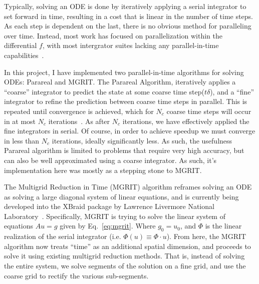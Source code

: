 \documentclass{article}
\begin{document}
Typically, solving an ODE is done by iteratively applying a serial integrator to set forward in time, resulting in a cost that is linear in the number of time steps.
As each step is dependent on the last, there is no obvious method for paralleling over time.
Instead, most work has focused on parallelization within the differential \(f\), with most intergrator suites lacking any parallel-in-time capabilities~\cite{ComparisonDifferentialEquation2017}.

In this project, I have implemented two parallel-in-time algorithms for solving ODEs: Parareal\cite{lionsResolutionEDPPar2001} and MGRIT\cite{friedhoffMULTIGRIDINTIMEALGORITHMSOLVING}.
The Parareal Algorithm, iteratively applies a ``coarse'' integrator to predict the state at some coarse time step(\( t\delta \)), and a ``fine'' integrator to refine the prediction between coarse time steps in parallel.
This is repeated until convergence is achieved, which for \(N_c\) coarse time steps will occur in at most \(N_c\) iterations~\cite{lionsResolutionEDPPar2001}.
As after \(N_c\) iterations, we have effectively applied the fine integrators in serial.
Of course, in order to achieve speedup we must converge in less than \(N_c\) iterations, ideally significantly less.
As such, the usefulness Parareal algorithm is limited to problems that require very high accuracy, but can also be well approximated using a coarse integrator.
As such, it's implementation here was mostly as a stepping stone to MGRIT.

The Multigrid Reduction in Time (MGRIT) algorithm reframes solving an ODE as solving a large diagonal system of linear equations, and is currently being developed into the XBraid package by Lawrence Livermore National Laboratory~\cite{xbraid-package}.
Specifically, MGRIT is trying to solve the linear system of equations \( A u = g \) given by Eq.~\ref{eq:mgrit}.
Where \( g_0 = u_0\), and \( \Phi \) is the linear realization of the serial integrator (i.e. \( \Phi(u) \equiv \Phi \cdot u \)).
From here, the MGRIT algorithm now treats ``time'' as an additional spatial dimension, and proceeds to solve it using existing multigrid reduction methods.
That is, instead of solving the entire system, we solve segments of the solution on a fine grid, and use the coarse grid to rectify the various sub-segments.
\end{document}
